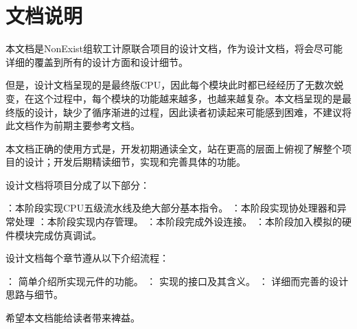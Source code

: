 \chapter{文档说明}

本文档是NonExist组软工计原联合项目的设计文档，作为设计文档，将会尽可能详细的覆盖到所有的设计方面和设计细节。

但是，设计文档呈现的是最终版CPU，因此每个模块此时都已经经历了无数次蜕变，在这个过程中，每个模块的功能越来越多，也越来越复杂。本文档呈现的是最终版的设计，缺少了循序渐进的过程，因此读者初读起来可能感到困难，不建议将此文档作为前期主要参考文档。

本文档正确的使用方式是，开发初期通读全文，站在更高的层面上俯视了解整个项目的设计；开发后期精读细节，实现和完善具体的功能。

设计文档将项目分成了以下部分：

    \begin{enumerate}
        ：本阶段实现CPU五级流水线及绝大部分基本指令。
        ：本阶段实现协处理器和异常处理
        ：本阶段实现内存管理。
        ：本阶段完成外设连接。
        ：本阶段加入模拟的硬件模块完成仿真调试。
    \end{enumerate}


设计文档每个章节遵从以下介绍流程：

    \begin{enumerate}
        ： 简单介绍所实现元件的功能。
        ： 实现的接口及其含义。
        ： 详细而完善的设计思路与细节。
    \end{enumerate}

希望本文档能给读者带来裨益。

